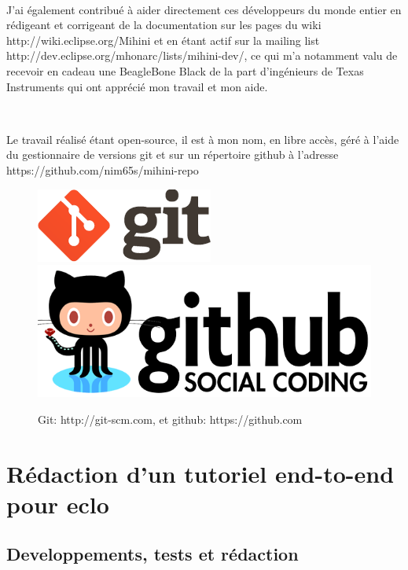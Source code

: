 \documentclass{article}
\begin{document}
~

J’ai également contribué à aider directement ces développeurs du monde entier en rédigeant et corrigeant de la documentation sur les pages du wiki http://wiki.eclipse.org/Mihini et en étant actif sur la mailing list http://dev.eclipse.org/mhonarc/lists/mihini-dev/, ce qui m’a notamment valu de recevoir en cadeau une BeagleBone Black de la part d’ingénieurs de Texas Instruments qui ont apprécié mon travail et mon aide.

~

Le travail réalisé étant open-source, il est à mon nom, en libre accès, géré à l’aide du gestionnaire de versions git et sur un répertoire github à l’adresse https://github.com/nim65s/mihini-repo

\begin{figure}[h!]
    \centering
    \includegraphics[width=\linewidth/3]{img/git.png}
    \includegraphics[width=\linewidth/3]{img/github.png}
    \caption{Git: http://git-scm.com, et github: https://github.com}
\end{figure}

\clearpage

\section{Rédaction d’un tutoriel end-to-end pour eclo}
\subsection{Developpements, tests et rédaction}
\end{document}
